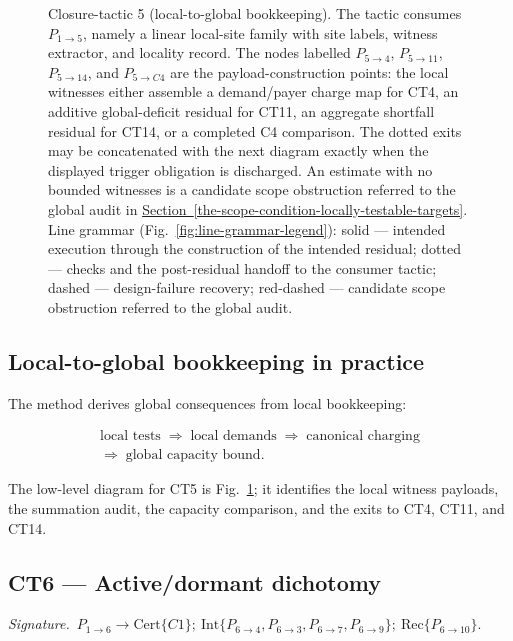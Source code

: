 \documentclass[
  11pt,
]{article}
\theoremstyle{definition}
\newcommand{\secref}[1]{\hyperref[#1]{Section~\ref*{#1}}}
\newcommand{\ctsignature}[1]{\par\noindent\emph{Signature.}\ #1\par\medskip}
\newcommand{\ctcert}[1]{\mathrm{Cert}\{#1\}}
\newcommand{\ctint}[1]{\mathrm{Int}\{#1\}}
\newcommand{\ctrec}[1]{\mathrm{Rec}\{#1\}}
\begin{document}
\begin{figure}[p]
{}
\caption[Closure-tactic 5: local-to-global bookkeeping]{Closure-tactic 5 (local-to-global bookkeeping).  The tactic consumes \(P_{1\to5}\), namely a linear local-site family with site labels, witness extractor, and locality record.  The nodes labelled \(P_{5\to4}\), \(P_{5\to11}\), \(P_{5\to14}\), and \(P_{5\to C4}\) are the payload-construction points: the local witnesses either assemble a demand/payer charge map for CT4, an additive global-deficit residual for CT11, an aggregate shortfall residual for CT14, or a completed C4 comparison.  The dotted exits may be concatenated with the next diagram exactly when the displayed trigger obligation is discharged.  An estimate with no bounded witnesses is a candidate scope obstruction referred to the global audit in \secref{the-scope-condition-locally-testable-targets}.  Line grammar (Fig.~\ref{fig:line-grammar-legend}): solid --- intended execution through the construction of the intended residual; dotted --- checks and the post-residual handoff to the consumer tactic; dashed --- design-failure recovery; red-dashed --- candidate scope obstruction referred to the global audit.}
\label{fig:ct5-local-global-bookkeeping}
\end{figure}
\FloatBarrier

\subsection*{Local-to-global bookkeeping in practice}

The method derives global consequences from local bookkeeping:

\[
\begin{gathered}
\text{local tests}
\;\Rightarrow\;
\text{local demands}
\;\Rightarrow\;
\text{canonical charging}\\
\Rightarrow\;
\text{global capacity bound}.
\end{gathered}
\]

The low-level diagram for CT5 is Fig.~\ref{fig:ct5-local-global-bookkeeping};
it identifies the local witness payloads, the summation audit, the
capacity comparison, and the exits to CT4, CT11, and CT14.



\subsection{CT6 --- Active/dormant dichotomy}\label{ct:6}\label{the-activedormant-dichotomy}
\ctsignature{\(P_{1\to6}\to \ctcert{C1};\ \ctint{P_{6\to4},P_{6\to3},P_{6\to7},P_{6\to9}};\ \ctrec{P_{6\to10}}\).}
\end{document}
